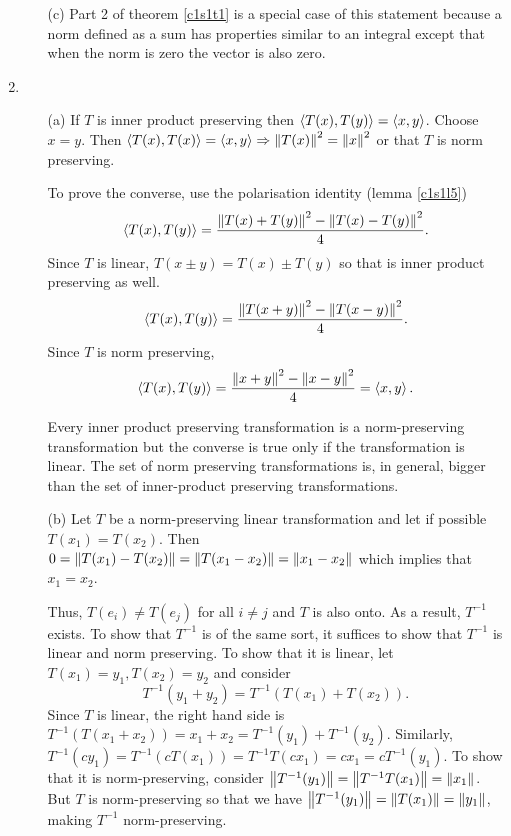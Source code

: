 \begin{enumerate}
\begin{enumerate}
\item[(c)] Part 2 of theorem \ref{c1s1t1} is a special case of this statement
because a norm defined as a sum has properties similar to an integral except
that when the norm is zero the vector is also zero.
\end{enumerate}

\item
\begin{enumerate}
\item[(a)] If $T$ is inner product preserving then $\left\langle{T(x), T(y)}\right\rangle=\left\langle{x, y}\right\rangle$.
Choose $x = y$. Then $\left\langle{T(x), T(x)}\right\rangle = \left\langle{x, y}\right\rangle \Rightarrow \left\Vert{T(x)}\right\Vert^2 =
\left\Vert{x}\right\Vert^2$ or that $T$ is norm preserving.

To prove the converse, use the polarisation identity (lemma \ref{c1s1l5})
\[
\left\langle{T(x), T(y)}\right\rangle = \frac{\left\Vert{T(x) + T(y)}\right\Vert^2 - \left\Vert{T(x) - T(y)}\right\Vert^2}{4}.
\]
Since $T$ is linear, $T(x \pm y) = T(x) \pm T(y)$ so that
is inner product preserving as well.
\[
\left\langle{T(x), T(y)}\right\rangle = \frac{\left\Vert{T(x + y)}\right\Vert^2 - \left\Vert{T(x - y)}\right\Vert^2}{4}.
\]
Since $T$ is norm preserving,
\[
\left\langle{T(x), T(y)}\right\rangle = \frac{\left\Vert{x + y}\right\Vert^2 - \left\Vert{x - y}\right\Vert^2}{4} = \left\langle{x, y}\right\rangle.
\]

\begin{rem}
Every inner product preserving transformation is a norm-preserving 
transformation but the converse is true only if the transformation is linear.
The set of norm preserving transformations is, in general, bigger than the
set of inner-product preserving transformations.
\end{rem}

\item[(b)] Let $T$ be a norm-preserving linear transformation and let if 
possible $T(x_1) = T(x_2)$. Then $0 = \left\Vert{T(x_1) - T(x_2)}\right\Vert = 
\left\Vert{T(x_1 - x_2)}\right\Vert = \left\Vert{x_1 - x_2}\right\Vert$ which implies that $x_1 = x_2$.

Thus, $T(e_i) \ne T(e_j)$ for all $i \ne j$ and $T$ is also onto. As a result,
$T^{-1}$ exists. To show that $T^{-1}$ is of the same sort, it suffices to show
that $T^{-1}$ is linear and norm preserving. To show that it is linear, let
$T(x_1) = y_1, T(x_2) = y_2$ and consider
\[
T^{-1}(y_1 + y_2) = T^{-1}(T(x_1) + T(x_2)).
\]
Since $T$ is linear, the right hand side is $T^{-1}(T(x_1 + x_2)) = x_1 + x_2
= T^{-1}(y_1) + T^{-1}(y_2)$. Similarly, $T^{-1}(cy_1) = T^{-1}(cT(x_1)) = 
T^{-1}T(cx_1) = cx_1 = cT^{-1}(y_1)$. To show that it is norm-preserving,
consider $\left\Vert{T^{-1}(y_1)}\right\Vert = \left\Vert{T^{-1}T(x_1)}\right\Vert = \left\Vert{x_1}\right\Vert$. But $T$ is
norm-preserving so that we have $\left\Vert{T^{-1}(y_1)}\right\Vert=\left\Vert{T(x_1)}\right\Vert=\left\Vert{y_1}\right\Vert$,
making $T^{-1}$ norm-preserving.
\end{enumerate}
\end{enumerate}

